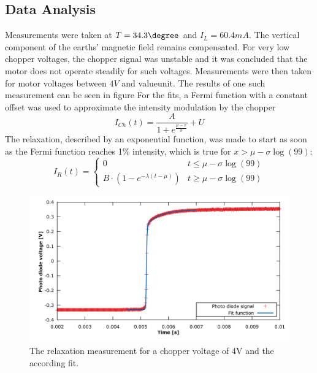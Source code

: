 \subsection{Data Analysis}
Measurements were taken at $T=\unit{34.3}{\degree}$ and $I_L=\unit{60.4}{mA}$. The vertical component of the earths' magnetic field remains compensated. For very low chopper voltages, the chopper signal was unstable and it was concluded that the motor does not operate steadily for such voltages. Measurements were then taken for motor voltages between $\unit{4}{V}$ and \unit{value}{unit}.
The results of one such measurement can be seen in figure 
For the fits, a Fermi function with a constant offset was used to approximate the intensity modulation by the chopper
\begin{equation}
I_{Ch}(t)=\frac{A}{1+e^{\frac{\mu-x}{\sigma}}}+U
\end{equation}
The relaxation, described by an exponential function, was made to start as soon as the Fermi function reaches 1\% intensity, which is true for $x>\mu-\sigma\log(99)$:
\begin{equation}
	I_R(t)=\begin{cases}
	0 &t\leq\mu-\sigma\log(99)\\
	B\cdot(1-e^{-\lambda(t-\mu)})&t\ge\mu-\sigma\log(99)
	\end{cases}
\end{equation}
\begin{figure}[htb]
	\centering
	\includegraphics[width=1.0\linewidth]{graphics/franzenexample}
	\caption[Example of Franzen relaxation]{The relaxation measurement for a chopper voltage of \unit{4}{V} and the according fit.}
	\label{fig:franzenexample}
\end{figure}


